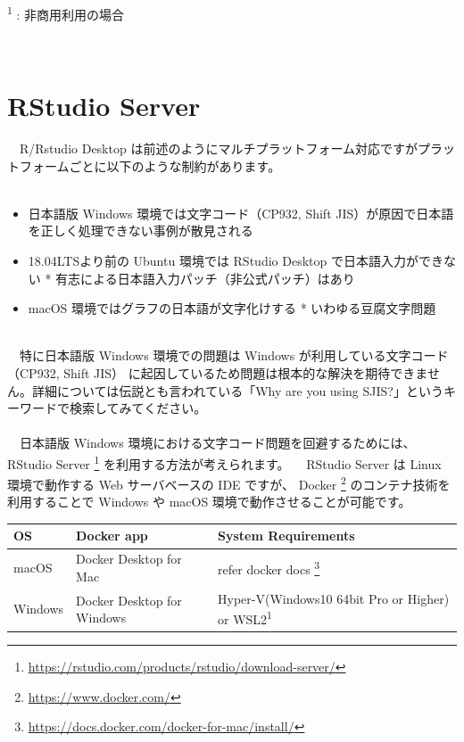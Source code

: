 \documentclass[
  12pt,
]{book}
\DeclareRobustCommand{\href}[2]{#2\footnote{\url{#1}}}
\providecommand{\tightlist}{%
  \setlength{\itemsep}{0pt}\setlength{\parskip}{0pt}}
\begin{document}
\textsuperscript{1} : 非商用利用の場合

　

\hypertarget{rstudio-server}{%
\chapter{RStudio Server}\label{rstudio-server}}

　R/Rstudio Desktop は前述のようにマルチプラットフォーム対応ですがプラットフォームごとに以下のような制約があります。\\
　

\begin{itemize}
\tightlist
\item
  日本語版 Windows 環境では文字コード（CP932, Shift JIS）が原因で日本語を正しく処理できない事例が散見される
\item
  18.04LTSより前の Ubuntu 環境では RStudio Desktop で日本語入力ができない * 有志による日本語入力パッチ（非公式パッチ）はあり
\item
  macOS 環境ではグラフの日本語が文字化けする * いわゆる豆腐文字問題
\end{itemize}

　\\
　特に日本語版 Windows 環境での問題は Windows が利用している文字コード（CP932, Shift JIS） に起因しているため問題は根本的な解決を期待できません。詳細については伝説とも言われている「Why are you using SJIS?」というキーワードで検索してみてください。\\
　\\
　日本語版 Windows 環境における文字コード問題を回避するためには、 \href{https://rstudio.com/products/rstudio/download-server/}{RStudio Server } を利用する方法が考えられます。 　RStudio Server は Linux 環境で動作する Web サーバベースの IDE ですが、 \href{https://www.docker.com/}{Docker } のコンテナ技術を利用することで Windows や macOS 環境で動作させることが可能です。 　

\begin{longtable}[]{@{}
  >{\raggedright\arraybackslash}p{}
  >{\raggedright\arraybackslash}p{}
  >{\raggedright\arraybackslash}p{}@{}}
\toprule
OS & Docker app & System Requirements \\
\midrule
\endhead
macOS & Docker Desktop for Mac & \href{https://docs.docker.com/docker-for-mac/install/}{refer docker docs } \\
Windows & Docker Desktop for Windows & Hyper-V(Windows10 64bit Pro or Higher) or WSL2\textsuperscript{1} \\
\bottomrule
\end{longtable}
\end{document}

